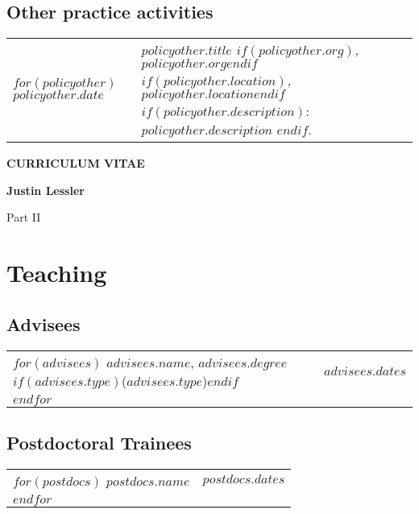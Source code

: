 \documentclass[martgin, line]{article}
\begin{document}
\subsection*{Other practice activities}

\setlength{\extrarowheight}{.75em}
\begin{longtable}[l]{lp{5in}}   
$for(policyother)$
$policyother.date$&
\parbox[t]{5in}{
    \textit{$policyother.title$%
    $if(policyother.org)$, $policyother.org$$endif$%
    $if(policyother.location)$, $policyother.location$$endif$}%
    $if(policyother.description)$: %
    $policyother.description$%
    $endif$.%
  }\\
$endfor$
\end{longtable}
\setlength{\extrarowheight}{0em}


  

\clearpage
  \begin{center}
    \textbf{CURRICULUM VITAE}

    \textbf{Justin Lessler}

    Part II
  \end{center}

\section*{Teaching}
\subsection*{Advisees}

\setlength{\extrarowheight}{.25em}
\begin{tabular}{ll}   
$for(advisees)$
$advisees.name$, $advisees.degree$
$if(advisees.type)$($advisees.type$)$endif$&
$advisees.dates$\\
$endfor$
\end{tabular}
\setlength{\extrarowheight}{0em}

\subsection*{Postdoctoral Trainees}

\setlength{\extrarowheight}{.25em}
\begin{tabular}{ll}   
$for(postdocs)$
$postdocs.name$&
$postdocs.dates$\\
$endfor$
\end{tabular}
\setlength{\extrarowheight}{0em}
\end{document}
